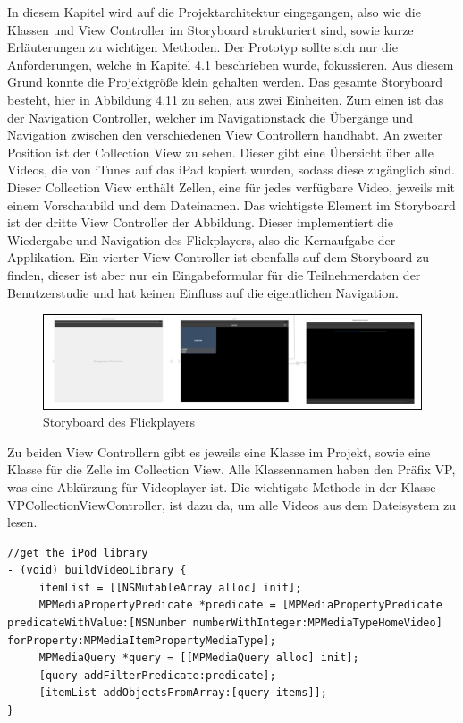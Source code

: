 \documentclass[11pt,a4paper]{report}
\begin{document}
In diesem Kapitel wird auf die Projektarchitektur eingegangen, also wie die Klassen und View Controller im Storyboard strukturiert sind, sowie kurze Erläuterungen zu wichtigen Methoden. Der Prototyp sollte sich nur die Anforderungen, welche in Kapitel 4.1 beschrieben wurde, fokussieren. Aus diesem Grund konnte die Projektgröße klein gehalten werden. Das gesamte Storyboard besteht, hier in Abbildung 4.11 zu sehen, aus zwei Einheiten. Zum einen ist das der Navigation Controller, welcher im Navigationstack die Übergänge und Navigation zwischen den verschiedenen View Controllern handhabt. An zweiter Position ist der Collection View zu sehen. Dieser gibt eine Übersicht über alle Videos, die von iTunes auf das iPad kopiert wurden, sodass diese zugänglich sind. Dieser Collection View enthält Zellen, eine für jedes verfügbare Video, jeweils mit einem Vorschaubild und dem Dateinamen. Das wichtigste Element im Storyboard ist der dritte View Controller der Abbildung. Dieser implementiert die Wiedergabe und Navigation des Flickplayers, also die Kernaufgabe der Applikation. Ein vierter View Controller ist ebenfalls auf dem Storyboard zu finden, dieser ist aber nur ein Eingabeformular für die Teilnehmerdaten der Benutzerstudie und hat keinen Einfluss auf die eigentlichen Navigation.
\begin{figure}[h]
\begin{center}
\includegraphics[scale=1]{./images/26.png}
\caption{Storyboard des Flickplayers}
\label{storyboard_flickplayer}
\end{center}
\end{figure}
Zu beiden View Controllern gibt es jeweils eine Klasse im Projekt, sowie eine Klasse für die Zelle im Collection View. Alle Klassennamen haben den Präfix VP, was eine Abkürzung für Videoplayer ist. Die wichtigste Methode in der Klasse VPCollectionViewController, ist dazu da, um alle Videos aus dem Dateisystem zu lesen.
\begin{lstlisting}
//get the iPod library
- (void) buildVideoLibrary {
	 itemList = [[NSMutableArray alloc] init];
	 MPMediaPropertyPredicate *predicate = [MPMediaPropertyPredicate predicateWithValue:[NSNumber numberWithInteger:MPMediaTypeHomeVideo] forProperty:MPMediaItemPropertyMediaType];
	 MPMediaQuery *query = [[MPMediaQuery alloc] init];
	 [query addFilterPredicate:predicate];
	 [itemList addObjectsFromArray:[query items]];
}
\end{lstlisting}
\end{document}
